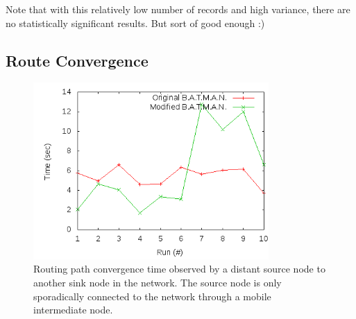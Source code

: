 Note that with this relatively low number of records and high variance, there
are no statistically significant results. But sort of good enough :)

\subsection{Route Convergence}

\begin{figure}[h]
	\centering
	\includegraphics[width=0.8\textwidth]{images/test_2.png}
	\caption{Routing path convergence time observed by a distant source node to another sink node in the network. The source node is only sporadically connected to the network through a mobile intermediate node.}
	\label{fig:results_test_2}
\end{figure}